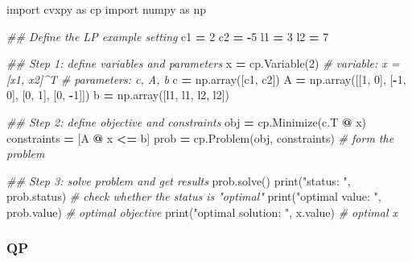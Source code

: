 \documentclass[
]{book}
\newenvironment{Shaded}{\begin{snugshade}}{\end{snugshade}}
\newcommand{\BuiltInTok}[1]{#1}
\newcommand{\CommentTok}[1]{\textcolor[rgb]{0.56,0.35,0.01}{\textit{#1}}}
\newcommand{\DecValTok}[1]{\textcolor[rgb]{0.00,0.00,0.81}{#1}}
\newcommand{\ImportTok}[1]{#1}
\newcommand{\NormalTok}[1]{#1}
\newcommand{\OperatorTok}[1]{\textcolor[rgb]{0.81,0.36,0.00}{\textbf{#1}}}
\newcommand{\StringTok}[1]{\textcolor[rgb]{0.31,0.60,0.02}{#1}}
\theoremstyle{definition}
\theoremstyle{definition}
\theoremstyle{definition}
\theoremstyle{definition}
\theoremstyle{remark}
\begin{document}
\begin{Shaded}
\begin{Highlighting}[]
\ImportTok{import}\NormalTok{ cvxpy }\ImportTok{as}\NormalTok{ cp}
\ImportTok{import}\NormalTok{ numpy }\ImportTok{as}\NormalTok{ np}

\CommentTok{\#\# Define the LP example setting}
\NormalTok{c1 }\OperatorTok{=} \DecValTok{2}
\NormalTok{c2 }\OperatorTok{=} \OperatorTok{{-}}\DecValTok{5}
\NormalTok{l1 }\OperatorTok{=} \DecValTok{3}
\NormalTok{l2 }\OperatorTok{=} \DecValTok{7}

\CommentTok{\#\# Step 1: define variables and parameters}
\NormalTok{x }\OperatorTok{=}\NormalTok{ cp.Variable(}\DecValTok{2}\NormalTok{) }\CommentTok{\# variable: x = [x1, x2]\^{}T}
\CommentTok{\# parameters: c, A, b}
\NormalTok{c }\OperatorTok{=}\NormalTok{ np.array([c1, c2]) }
\NormalTok{A }\OperatorTok{=}\NormalTok{ np.array([[}\DecValTok{1}\NormalTok{, }\DecValTok{0}\NormalTok{], [}\OperatorTok{{-}}\DecValTok{1}\NormalTok{, }\DecValTok{0}\NormalTok{], [}\DecValTok{0}\NormalTok{, }\DecValTok{1}\NormalTok{], [}\DecValTok{0}\NormalTok{, }\OperatorTok{{-}}\DecValTok{1}\NormalTok{]])}
\NormalTok{b }\OperatorTok{=}\NormalTok{ np.array([l1, l1, l2, l2])}

\CommentTok{\#\# Step 2: define objective and constraints}
\NormalTok{obj }\OperatorTok{=}\NormalTok{ cp.Minimize(c.T }\OperatorTok{@}\NormalTok{ x)}
\NormalTok{constraints }\OperatorTok{=}\NormalTok{ [A }\OperatorTok{@}\NormalTok{ x }\OperatorTok{\textless{}=}\NormalTok{ b]}
\NormalTok{prob }\OperatorTok{=}\NormalTok{ cp.Problem(obj, constraints) }\CommentTok{\# form the problem}

\CommentTok{\#\# Step 3: solve problem and get results}
\NormalTok{prob.solve()  }
\BuiltInTok{print}\NormalTok{(}\StringTok{"status: "}\NormalTok{, prob.status) }\CommentTok{\# check whether the status is "optimal"}
\BuiltInTok{print}\NormalTok{(}\StringTok{"optimal value: "}\NormalTok{, prob.value) }\CommentTok{\# optimal objective}
\BuiltInTok{print}\NormalTok{(}\StringTok{"optimal solution: "}\NormalTok{, x.value) }\CommentTok{\# optimal x}
\end{Highlighting}
\end{Shaded}

\subsubsection{QP}\label{qp}
\end{document}

